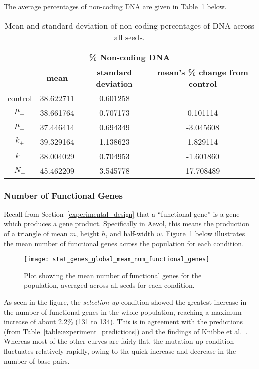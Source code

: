 The average percentages of non-coding DNA are given in Table~\ref{table:non-coding_DNA_mean_and_standard_deviation} below. 
\begin{table}[H]
	\begin{tabular}{|c|c|c|c|}
		\hline
		\multicolumn{4}{c}{\Large \textbf{\% Non-coding DNA}} \\
		\hline
		& \textbf{mean} & \textbf{standard deviation} & \textbf{mean's \% change from control} \\
		\hline \hline
		control & 38.622711 & 0.601258 & \textemdash \\ 
		\hline
		$\mu_+$ & 38.661764 & 0.707173 & 0.101114 \\ 
		\hline
		$\mu_-$ & 37.446414 & 0.694349 & -3.045608 \\ 
		\hline
		$k_+$ & 39.329164 & 1.138623 & 1.829114 \\ 
		\hline
		$k_-$ & 38.004029 & 0.704953 & -1.601860 \\ 
		\hline
		$N_-$ & 45.462209 & 3.545778 & 17.708489 \\ 
		\hline
	\end{tabular}
	\caption[Non-coding DNA mean and standard deviation]{Mean and standard deviation of non-coding percentages of DNA across all seeds.}
	\label{table:non-coding_DNA_mean_and_standard_deviation}
\end{table}

\subsubsection{Number of Functional Genes}\label{sec:number_of_functional_genes}
Recall from Section~\ref{experimental_design} that a ``functional gene'' is a gene which produces a gene product. Specifically in Aevol, this means the production of a triangle of mean $m$, height $h$, and half-width $w$. Figure~\ref{fig:mean_num_functional_genes} below illustrates the mean number of functional genes across the population for each condition.  
\begin{figure}[H]
	\centering
	\texttt{[image: stat\_genes\_global\_mean\_num\_functional\_genes]}
	\caption[Mean number of functional genes]{Plot showing the mean number of functional genes for the population, averaged across all seeds for each condition.}
	\label{fig:mean_num_functional_genes}
\end{figure}
As seen in the figure, the \textit{selection up} condition showed the greatest increase in the number of functional genes in the whole population, reaching a maximum increase of about 2.2\% (131 to 134). This is in agreement with the predictions (from Table~\ref{table:experiment_predictions}) and the findings of Knibbe et al.~\cite{Knibbe2007}. Whereas most of the other curves are fairly flat, the mutation up condition fluctuates relatively rapidly, owing to the quick increase and decrease in the number of base pairs. 

